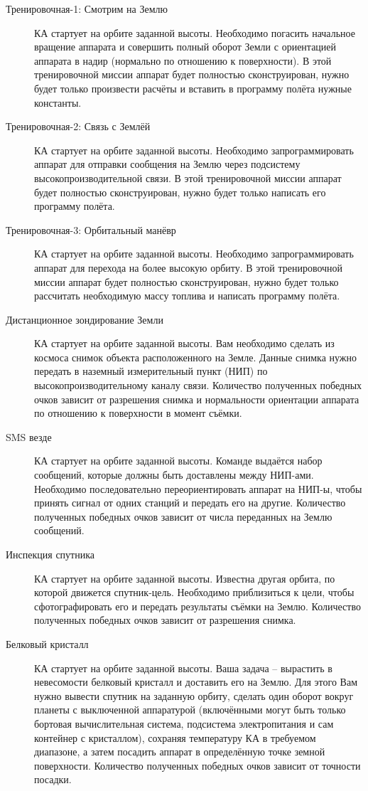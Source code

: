 \documentclass[12pt,a4paper]{article}
\begin{document}
\begin{description}
  \item[Тренировочная-1: Смотрим на Землю] КА стартует на орбите заданной
    высоты. Необходимо погасить начальное вращение аппарата и совершить полный оборот
    Земли с ориентацией аппарата в надир (нормально по отношению к поверхности). В этой
    тренировочной миссии аппарат будет полностью сконструирован, нужно будет только
    произвести расчёты и вставить в программу полёта нужные константы.
  \item[Тренировочная-2: Связь с Землёй] КА стартует на орбите заданной
    высоты. Необходимо запрограммировать аппарат для отправки сообщения на Землю через
    подсистему высокопроизводительной связи. В этой тренировочной миссии аппарат будет
    полностью сконструирован, нужно будет только написать его программу полёта.
  \item[Тренировочная-3: Орбитальный манёвр] КА стартует на орбите заданной
    высоты. Необходимо запрограммировать аппарат для перехода на более высокую орбиту. В
    этой тренировочной миссии аппарат будет полностью сконструирован, нужно будет только
    рассчитать необходимую массу топлива и написать программу полёта.
  \item[Дистанционное зондирование Земли] КА стартует на орбите заданной высоты. Вам
    необходимо сделать из космоса снимок объекта расположенного на Земле. Данные снимка
    нужно передать в наземный измерительный пункт (НИП) по высокопроизводительному каналу
    связи. Количество полученных победных очков зависит от разрешения снимка и
    нормальности ориентации аппарата по отношению к поверхности в момент съёмки.
  \item[SMS везде] КА стартует на орбите заданной высоты. Команде выдаётся набор
    сообщений, которые должны быть доставлены между НИП-ами. Необходимо последовательно
    переориентировать аппарат на НИП-ы, чтобы принять сигнал от одних станций и передать
    его на другие. Количество полученных победных очков зависит от числа переданных на
    Землю сообщений.
  \item[Инспекция спутника] КА стартует на орбите заданной высоты. Известна другая орбита,
    по которой движется спутник-цель. Необходимо приблизиться к цели, чтобы
    сфотографировать его и передать результаты съёмки на Землю. Количество полученных
    победных очков зависит от разрешения снимка.
  \item[Белковый кристалл] КА стартует на орбите заданной высоты. Ваша задача – вырастить
    в невесомости белковый кристалл и доставить его на Землю. Для этого Вам нужно вывести
    спутник на заданную орбиту, сделать один оборот вокруг планеты с выключенной
    аппаратурой (включёнными могут быть только бортовая вычислительная система, подсистема
    электропитания и сам контейнер с кристаллом), сохраняя температуру КА в требуемом
    диапазоне, а затем посадить аппарат в определённую точке земной
    поверхности. Количество полученных победных очков зависит от точности посадки.
\end{description}
\end{document}
